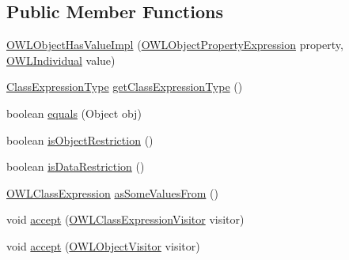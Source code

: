 \subsection*{Public Member Functions}
\begin{DoxyCompactItemize}
\item 
\hyperlink{classuk_1_1ac_1_1manchester_1_1cs_1_1owl_1_1owlapi_1_1_o_w_l_object_has_value_impl_adec26e758ad082a8b1c1954a31852024}{O\-W\-L\-Object\-Has\-Value\-Impl} (\hyperlink{interfaceorg_1_1semanticweb_1_1owlapi_1_1model_1_1_o_w_l_object_property_expression}{O\-W\-L\-Object\-Property\-Expression} property, \hyperlink{interfaceorg_1_1semanticweb_1_1owlapi_1_1model_1_1_o_w_l_individual}{O\-W\-L\-Individual} value)
\item 
\hyperlink{enumorg_1_1semanticweb_1_1owlapi_1_1model_1_1_class_expression_type}{Class\-Expression\-Type} \hyperlink{classuk_1_1ac_1_1manchester_1_1cs_1_1owl_1_1owlapi_1_1_o_w_l_object_has_value_impl_a3b15aa5e6d240190437e442dc15ae2a7}{get\-Class\-Expression\-Type} ()
\item 
boolean \hyperlink{classuk_1_1ac_1_1manchester_1_1cs_1_1owl_1_1owlapi_1_1_o_w_l_object_has_value_impl_a84af0f1d355e79ae0cc101e88abdf80d}{equals} (Object obj)
\item 
boolean \hyperlink{classuk_1_1ac_1_1manchester_1_1cs_1_1owl_1_1owlapi_1_1_o_w_l_object_has_value_impl_a1b4425b05a7456242d55496cb0a18d73}{is\-Object\-Restriction} ()
\item 
boolean \hyperlink{classuk_1_1ac_1_1manchester_1_1cs_1_1owl_1_1owlapi_1_1_o_w_l_object_has_value_impl_a04ead00a02b29e5905eb59461c2dbbc9}{is\-Data\-Restriction} ()
\item 
\hyperlink{interfaceorg_1_1semanticweb_1_1owlapi_1_1model_1_1_o_w_l_class_expression}{O\-W\-L\-Class\-Expression} \hyperlink{classuk_1_1ac_1_1manchester_1_1cs_1_1owl_1_1owlapi_1_1_o_w_l_object_has_value_impl_a034e679c2cb92a424f46043415737045}{as\-Some\-Values\-From} ()
\item 
void \hyperlink{classuk_1_1ac_1_1manchester_1_1cs_1_1owl_1_1owlapi_1_1_o_w_l_object_has_value_impl_a591b8daff6ff627ffaa2942054495334}{accept} (\hyperlink{interfaceorg_1_1semanticweb_1_1owlapi_1_1model_1_1_o_w_l_class_expression_visitor}{O\-W\-L\-Class\-Expression\-Visitor} visitor)
\item 
void \hyperlink{classuk_1_1ac_1_1manchester_1_1cs_1_1owl_1_1owlapi_1_1_o_w_l_object_has_value_impl_a193d6803b6d572cf245b2bc44af8e5f5}{accept} (\hyperlink{interfaceorg_1_1semanticweb_1_1owlapi_1_1model_1_1_o_w_l_object_visitor}{O\-W\-L\-Object\-Visitor} visitor)
\end{DoxyCompactItemize}
